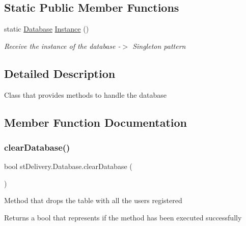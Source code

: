 \subsection*{Static Public Member Functions}
\begin{DoxyCompactItemize}
\item 
static \hyperlink{classst_delivery_1_1_database}{Database} \hyperlink{classst_delivery_1_1_database_a460aa2a51464b7f4c098ba1e8a2aa213}{Instance} ()
\begin{DoxyCompactList}\small\item\em Receive the instance of the database -\/$>$ Singleton pattern \end{DoxyCompactList}\end{DoxyCompactItemize}


\subsection{Detailed Description}
Class that provides methods to handle the database 



\subsection{Member Function Documentation}
\mbox{\label{classst_delivery_1_1_database_ad06ec86e4219cfa71dd3aaf34ee456b4}} 
\subsubsection{\texorpdfstring{clear\+Database()}{clearDatabase()}}
{\footnotesize\ttfamily bool st\+Delivery.\+Database.\+clear\+Database (\begin{DoxyParamCaption}{ }\end{DoxyParamCaption})}



Method that drops the table with all the users registered 

\begin{DoxyReturn}{Returns}
a bool that represents if the method has been executed successfully
\end{DoxyReturn}
\mbox{\label{classst_delivery_1_1_database_a4f96c508240ac2400823813c5d39a61a}} 
